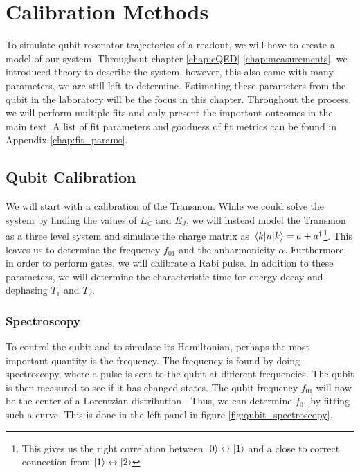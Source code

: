 \chapter{Calibration Methods}\label{chap:calibration}
To simulate qubit-resonator trajectories of a readout, we will have to create a model of our system. Throughout chapter \ref{chap:cQED}-\ref{chap:measurements}, we introduced theory to describe the system, however, this also came with many parameters, we are still left to determine. Estimating these parameters from the qubit in the laboratory will be  the focus in this chapter. Throughout the process, we will perform multiple fits and only present the important outcomes in the main text. A list of fit parameters and goodness of fit metrics can be found in Appendix \ref{chap:fit_params}.




\section{Qubit Calibration}
We will start with a calibration of the Transmon. While we could solve the system by finding the values of $E_C$ and $E_J$, we will instead model the Transmon as a three level system and simulate the charge matrix as $\mel{k}{n}{k} = a + a^\dagger$\footnote{This gives us the right correlation between $\ket{0}\leftrightarrow \ket{1}$ and a close to correct connection from $\ket{1}\leftrightarrow\ket{2}$}. This leaves us to determine the frequency $f_{01}$ and the anharmonicity $\alpha$. Furthermore, in order to perform gates, we will calibrate a Rabi pulse. In addition to these parameters, we will determine the characteristic time for energy decay and dephasing  $T_1$ and $T_2$.

\subsection{Spectroscopy}\label{sec:qubit_spectroscopy}
To control the qubit and to simulate its Hamiltonian, perhaps the most important quantity is the frequency. The frequency is found by doing spectroscopy, where a pulse is sent to the qubit at different frequencies. The qubit is then measured to see if it has changed states. The qubit frequency $f_{01}$ will now be the center of a Lorentzian distribution \cite{hucul_spectroscopy_2017}. Thus, we can determine $f_{01}$ by fitting such a curve. This is done in the left panel in figure \ref{fig:qubit_spectroscopy}.

